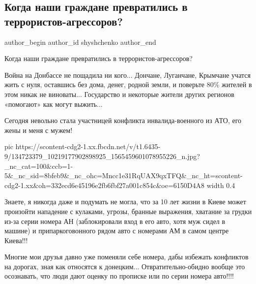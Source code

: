  
 
 
 
 
 
\subsection{Когда наши граждане превратились в террористов-агрессоров?}
\label{sec:28_12_2020.fb.shyshchenko.1.terror_ato_grazhdane}
 
\ifcmt
 author_begin
   author_id shyshchenko
 author_end
\fi

Когда наши граждане превратились в террористов-агрессоров? 

Война на Донбассе не пощадила ни кого... Дончане, Луганчане, Крымчане учатся
жить с нуля, оставшись без дома, денег, родной земли, и поверьте 80\% жителей в
этом никак не виноваты... Государство и некоторые жители других регионов
«помогают» как могут выжить... 

Сегодня невольно стала участницей конфликта инвалида-военного из АТО, его жены
и меня с мужем! 

\ifcmt
  pic https://scontent-cdg2-1.xx.fbcdn.net/v/t1.6435-9/134723379_10219177902898925_1565459601078955226_n.jpg?_nc_cat=100&ccb=1-5&_nc_sid=8bfeb9&_nc_ohc=Mncc1e31RqUAX9qxTFQ&_nc_ht=scontent-cdg2-1.xx&oh=332ecd6e45196e2fb6fbf27a001c854c&oe=6150D4A8
  width 0.4
\fi

Знаете, я никогда даже и подумать не могла, что за 10 лет жизни в Киеве может
произойти нападение с кулаками, угрозы, бранные выражения, хватание за грудки
из-за серии номера АН (заблокировали вход в его авто, хотя муж сидел в машине)
и припаркоговонного рядом авто с номерами АМ в самом центре Киева!!! 

Многие мои друзья давно уже поменяли себе номера, дабы избежать конфликтов на
дорогах, зная как относятся к донецким... Отвратительно-обидно вообще это
осознавать, что люди дают оценку по прописке или по серии номера авто!!!!

